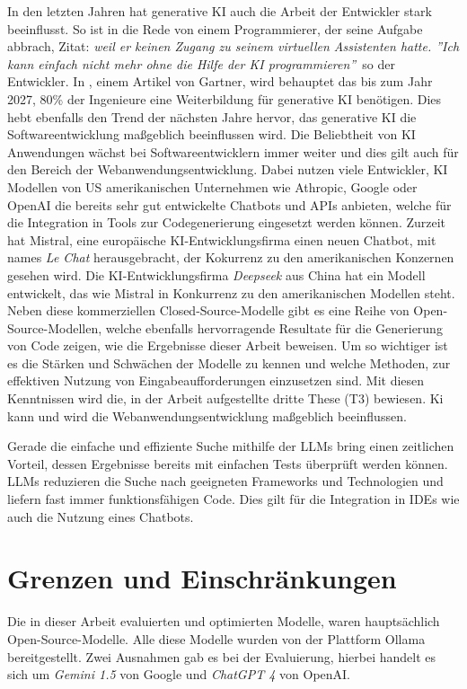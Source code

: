 In den letzten Jahren hat generative KI auch die Arbeit der Entwickler stark beeinflusst. So ist in \cite{focus-online-2025} die Rede von einem Programmierer, der seine Aufgabe abbrach, Zitat: \glqq \textit{weil er keinen Zugang zu seinem virtuellen Assistenten hatte. ''Ich kann einfach nicht mehr ohne die Hilfe der KI programmieren''}\grqq \ so der Entwickler. In \cite{company_gartner_2024}, einem Artikel von Gartner, wird behauptet das bis zum Jahr 2027, 80\% der Ingenieure eine Weiterbildung für generative KI benötigen. Dies hebt ebenfalls den Trend der nächsten Jahre hervor, das generative KI die Softwareentwicklung maßgeblich beeinflussen wird.
Die Beliebtheit von KI Anwendungen wächst bei Softwareentwicklern immer weiter und dies gilt auch für den Bereich der Webanwendungsentwicklung. Dabei nutzen viele Entwickler, KI Modellen von US amerikanischen Unternehmen wie Athropic, Google oder OpenAI die bereits sehr gut entwickelte Chatbots und APIs anbieten, welche für die Integration in Tools zur Codegenerierung eingesetzt werden können. Zurzeit hat Mistral, eine europäische KI-Entwicklungsfirma einen neuen Chatbot, mit names \textit{Le Chat} herausgebracht, der Kokurrenz zu den amerikanischen Konzernen gesehen wird. Die KI-Entwicklungsfirma \textit{Deepseek} aus China hat ein Modell entwickelt, das wie Mistral in Konkurrenz zu den amerikanischen Modellen steht. Neben diese kommerziellen Closed-Source-Modelle gibt es eine Reihe von Open-Source-Modellen, welche ebenfalls hervorragende Resultate für die Generierung von Code zeigen, wie die Ergebnisse dieser Arbeit beweisen. Um so wichtiger ist es die Stärken und Schwächen der Modelle zu kennen und welche Methoden, zur effektiven Nutzung von Eingabeaufforderungen einzusetzen sind. Mit diesen Kenntnissen wird die, in der Arbeit aufgestellte dritte These (T3) bewiesen. Ki kann und wird die Webanwendungsentwicklung maßgeblich beeinflussen.\vspace{0.2cm}

Gerade die einfache und effiziente Suche mithilfe der LLMs bring einen zeitlichen Vorteil, dessen Ergebnisse bereits mit einfachen Tests überprüft werden können. LLMs reduzieren die Suche nach geeigneten Frameworks und Technologien und liefern fast immer funktionsfähigen Code. Dies gilt für die Integration in IDEs wie auch die Nutzung eines Chatbots.

\section{Grenzen und Einschränkungen}
Die in dieser Arbeit evaluierten und optimierten Modelle, waren hauptsächlich Open-Source-Modelle. Alle diese Modelle wurden von der Plattform Ollama bereitgestellt. Zwei Ausnahmen gab es bei der Evaluierung, hierbei handelt es sich um \textit{Gemini 1.5} von Google und \textit{ChatGPT 4} von OpenAI.\vspace{0.2cm}

